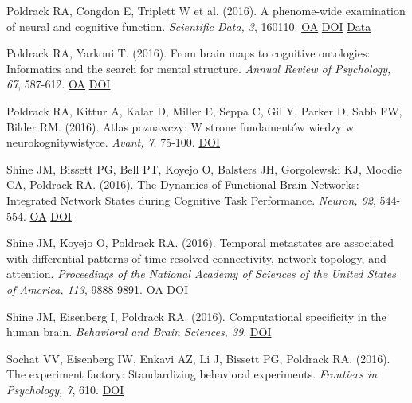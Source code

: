 \documentclass[10pt, letterpaper]{article}
\begin{document}
Poldrack RA, Congdon E, Triplett W et al. (2016). A phenome-wide examination of neural and cognitive function. \textit{Scientific Data, 3}, 160110. \href{https://www.ncbi.nlm.nih.gov/pmc/articles/PMC5139672}{OA} \href{https://doi.org/10.1038/sdata.2016.110}{DOI} \href{https://openneuro.org/datasets/ds000030/versions/1.0.0}{Data} \vspace{2mm}

Poldrack RA, Yarkoni T.  (2016). From brain maps to cognitive ontologies: Informatics and the search for mental structure. \textit{Annual Review of Psychology, 67}, 587-612. \href{https://www.ncbi.nlm.nih.gov/pmc/articles/PMC4701616}{OA} \href{https://doi.org/10.1146/annurev-psych-122414-033729}{DOI} \vspace{2mm}

Poldrack RA, Kittur A, Kalar D, Miller E, Seppa C, Gil Y, Parker D, Sabb FW, Bilder RM.  (2016). Atlas poznawczy: W strone fundamentów wiedzy w neurokognitywistyce. \textit{Avant, 7}, 75-100. \href{https://doi.org/10.26913/70302016.0109.0006}{DOI} \vspace{2mm}

Shine JM, Bissett PG, Bell PT, Koyejo O, Balsters JH, Gorgolewski KJ, Moodie CA, Poldrack RA.  (2016). The Dynamics of Functional Brain Networks: Integrated Network States during Cognitive Task Performance. \textit{Neuron, 92}, 544-554. \href{https://www.ncbi.nlm.nih.gov/pmc/articles/PMC5073034}{OA} \href{https://doi.org/10.1016/j.neuron.2016.09.018}{DOI} \vspace{2mm}

Shine JM, Koyejo O, Poldrack RA.  (2016). Temporal metastates are associated with differential patterns of time-resolved connectivity, network topology, and attention. \textit{Proceedings of the National Academy of Sciences of the United States of America, 113}, 9888-9891. \href{https://www.ncbi.nlm.nih.gov/pmc/articles/PMC5024627}{OA} \href{https://doi.org/10.1073/pnas.1604898113}{DOI} \vspace{2mm}

Shine JM, Eisenberg I, Poldrack RA.  (2016). Computational specificity in the human brain. \textit{Behavioral and Brain Sciences, 39}. \href{https://doi.org/10.1017/s0140525x1500165x}{DOI} \vspace{2mm}

Sochat VV, Eisenberg IW, Enkavi AZ, Li J, Bissett PG, Poldrack RA.  (2016). The experiment factory: Standardizing behavioral experiments. \textit{Frontiers in Psychology, 7}, 610. \href{https://doi.org/10.3389/fpsyg.2016.00610}{DOI} \vspace{2mm}
\end{document}
